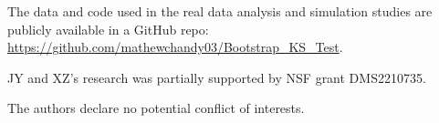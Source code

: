 \documentclass[APA,Times1COL]{WileyNJDv5} %
\begin{document}

The data and code used in the real data analysis and simulation
studies are publicly available in a GitHub repo:
\url{https://github.com/mathewchandy03/Bootstrap_KS_Test}.



JY and XZ's research was partially supported by NSF grant
DMS2210735.


The authors declare no potential conflict of interests.




\end{document}
